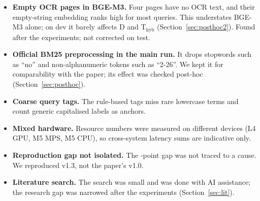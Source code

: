 \documentclass[11pt,a4paper]{article}
\begin{document}
\begin{itemize}
  \item \textbf{Empty OCR pages in BGE-M3.} Four pages have no OCR text, and their empty-string embedding ranks high for most queries. This understates BGE-M3 alone; on dev it barely affects D and T$_\text{hyb}$ (Section~\ref{sec:posthoc2}). Found after the experiments; not corrected on test.
  \item \textbf{Official BM25 preprocessing in the main run.} It drops stopwords such as ``no'' and non-alphanumeric tokens such as ``2-26''. We kept it for comparability with the paper; its effect was checked post-hoc (Section~\ref{sec:posthoc}).
  \item \textbf{Coarse query tags.} The rule-based tags miss rare lowercase terms and count generic capitalised labels as anchors.
  \item \textbf{Mixed hardware.} Resource numbers were measured on different devices (L4 GPU, M5 MPS, M5 CPU), so cross-system latency sums are indicative only.
  \item \textbf{Reproduction gap not isolated.} The \gapCardPts{}-point gap was not traced to a cause. We reproduced v1.3, not the paper's v1.0.
  \item \textbf{Literature search.} The search was small and was done with AI assistance; the research gap was narrowed after the experiments (Section~\ref{sec:lit}).
\end{itemize}
\end{document}
